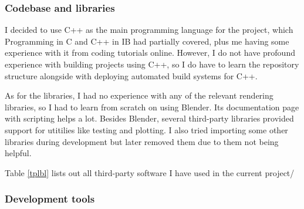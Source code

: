 \documentclass[12pt,a4paper,twoside,openright]{report}
\begin{document}
\subsubsection{Codebase and libraries}

I decided to use C++ as the main programming language for the project, which Programming in C and C++ in IB had partially covered, plus me having some experience with it from coding tutorials online. However, I do not have profound experience with building projects using C++, so I do have to learn the repository structure alongside with deploying automated build systems for C++.

As for the libraries, I had no experience with any of the relevant rendering libraries, so I had to learn from scratch on using Blender\cite{blender}. Its documentation page with scripting\cite{blenderdoc} helps a lot. Besides Blender, several third-party libraries provided support for utitilies like testing and plotting. I also tried importing some other libraries during development but later removed them due to them not being helpful.

Table \ref{tplbl} lists out all third-party software I have used in the current project/

\begin{table}[h]\label{tplbl}
    \centering
    \caption{List of Third-Party Software Used}
    \label{tab:third_party_software}
\end{table}

\subsubsection{Development tools}
\end{document}
